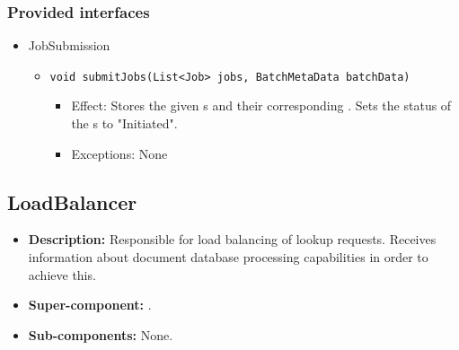 \subsubsection*{Provided interfaces}
\begin{itemize}
    \item JobSubmission
    \begin{itemize}
        \item \texttt{void submitJobs(List<Job> jobs, BatchMetaData batchData)}
        \begin{itemize}
            \item Effect: Stores the given s and their corresponding . Sets the status of the s to "Initiated".
            \item Exceptions: None
        \end{itemize}
    \end{itemize}
\end{itemize}

\subsection{LoadBalancer}
\begin{itemize}
    \item \textbf{Description:} Responsible for load balancing of lookup requests. Receives information about document database processing capabilities in order to achieve this.
    \item \textbf{Super-component:} .
    \item \textbf{Sub-components:} None.
\end{itemize}

